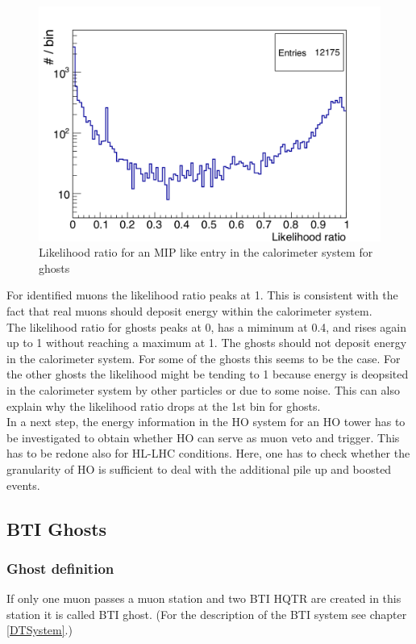 \begin{figure}
\begin{minipage}[t]{0.95\textwidth}
\includegraphics[width=\textwidth]{Figures/scheuch/LikelihoodGhost.png}
\caption{Likelihood ratio for an MIP like entry in the calorimeter system for ghosts}
\label{LikelihoodGhost}
\end{minipage}
\end{figure}
For identified muons the likelihood ratio peaks at 1. This is consistent with the fact that real muons should deposit energy within the calorimeter system.\\
The likelihood ratio for ghosts peaks at 0, has a miminum at 0.4, and rises again up to 1 without reaching a maximum at 1. The ghosts should not deposit energy in the calorimeter system. For some of the ghosts this seems to be the case. For the other ghosts the likelihood might be tending to 1 because energy is deopsited in the calorimeter system by other particles or due to some noise. This can also explain why the likelihood ratio drops at the 1st bin for ghosts.\\
In a next step, the energy information in the HO system for an HO tower has to be investigated to obtain whether HO can serve as muon veto and trigger. This has to be redone also for HL-LHC conditions. Here, one has to check whether the granularity of HO is sufficient to deal with the additional pile up and boosted events.
\subsection{BTI Ghosts}
\subsubsection{Ghost definition}
If only one muon passes a muon station and two BTI HQTR are created in this station it is called BTI ghost. (For the description of the BTI system see chapter \ref{DTSystem}.)
